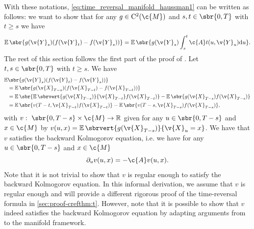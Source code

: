 With these notations, \eqref{eq:time_reversal_manifold_haussman1} can be written as follows: we want to show that for any \(g \in \mathrm{C}^2(\c{M})\) and \(s, t \in \sbr{0,T}\) with \(t \geq s\) we have \begin{equation} \label{eq:time_reversal_manifold_haussman1} {\E\sbr{g(\v{Y}_s)(f(\v{Y}_t) - f(\v{Y}_s))} = \E\sbr{g(\v{Y}_s)\int_s^t \c{A}t(u, \v{Y}_u) \mathrm{d} u} .
	}
\end{equation}
The rest of this section follows the first part of the proof of \textcite[Theorem 2.1]{haussmann1986time}.
Let \(t, s \in \sbr{0,T}\) with \(t \geq s\).
We have \begin{align} \E&\sbr{g(\v{Y}_s)(f(\v{Y}_t) - f(\v{Y}_s))}\\ &= {\E\sbr{g(\v{X}_{T-s})(f(\v{X}_{T-t}) - f(\v{X}_{T-t}))}} \\ &= {\E\sbr{\E\sbrvert{g(\v{X}_{T-s})}{\v{X}_{T-t}}f(\v{X}_{T-t})} - \E\sbr{g(\v{X}_{T-s})f(\v{X}_{T-s})}} \\ &= {\E\sbr{v(T-t,\v{X}_{T-t})f(\v{X}_{T-t})} - \E\sbr{v(T-s,\v{X}_{T-s})f(\v{X}_{T-s})}} , \label{eq:first_der} \end{align} with \(v: \ \sbr{0,T-s} \times \c{M} \to \R\) given for any \(u \in \sbr{0,T-s}\) and \(x \in \c{M}\) by \(v(u,x) = \E\sbrvert{g(\v{X}_{T-s})}{\v{X}_u=x}\).
We have that \(v\) satisfies the backward Kolmogorov equation, i.e. we have for any \(u \in \sbr{0,T-s}\) and \(x \in \c{M}\) \begin{equation} \label{eq:backward_kolmogorov} \partial_u v(u,x) = -\c{A} v(u,x) .
\end{equation}
Note that it is not trivial to show that \(v\) is regular enough to satisfy the backward Kolmogorov equation.
In this informal derivation, we assume that \(v\) is regular enough and will provide a different rigorous proof of the time-reversal formula in \cref{sec:proof-crefthm:t}.
However, note that it is possible to show that \(v\) indeed satisfies the backward Kolmogorov equation by adapting arguments from \textcite{haussmann1986time} to the manifold framework.

